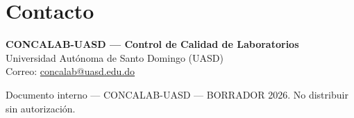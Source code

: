 \documentclass[12pt, letterpaper]{article}
\begin{document}
\section{Contacto}

\begin{cajainfo}
\textbf{CONCALAB-UASD — Control de Calidad de Laboratorios}\\
Universidad Autónoma de Santo Domingo (UASD)\\
Correo: \href{mailto:concalab@uasd.edu.do}{concalab@uasd.edu.do}
\end{cajainfo}

\vfill
{\small\color{gray}\centering Documento interno — CONCALAB-UASD — BORRADOR 2026. No distribuir sin autorización.}
\end{document}
